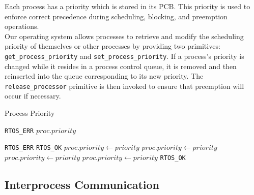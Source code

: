 \documentclass[12pt]{report}
\begin{document}
Each process has a priority which is stored in its PCB. This priority is used to enforce correct precedence during scheduling, blocking, and preemption operations.\\

Our operating system allows processes to retrieve and modify the scheduling priority of themselves or other processes by providing two primitives: \texttt{get_process_priority} and \texttt{set_process_priority}. If a process's priority is changed while it resides in a process control queue, it is removed and then reinserted into the queue corresponding to its new priority. The \texttt{release_processor} primitive is then invoked to ensure that preemption will occur if necessary.

\begin{algorithm}
\caption{Process Priority}
\begin{algorithmic}[1]
        \State \Return \texttt{RTOS_ERR}
    \EndIf
    \State \Return $proc.priority$
\EndProcedure

\Statex

        \State \Return \texttt{RTOS_ERR}
    \EndIf
        \State \Return \texttt{RTOS_OK} 
    \EndIf
        \State {}
        \State $proc.priority \leftarrow priority$
        \State {}
        \State {}
        \State $proc.priority \leftarrow priority$
        \State {}
        \State {}
        \State $proc.priority \leftarrow priority$
        \State {}
    \Else
        \State $proc.priority \leftarrow priority$
    \EndIf
    \State {}
    \State \Return \texttt{RTOS_OK}
\EndProcedure
\end{algorithmic}
\end{algorithm}

\subsection{Interprocess Communication}
\end{document}
